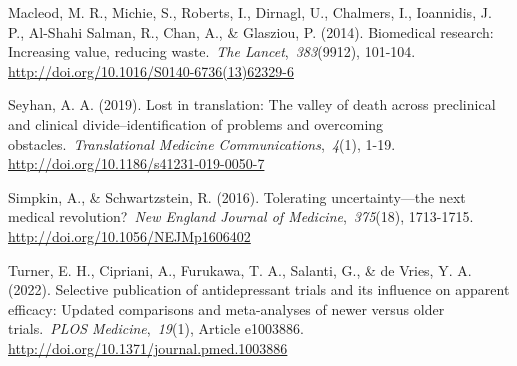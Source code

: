 \documentclass[authordate, empirical, issue]{jote-new-article}
\begin{document}
	Macleod, M. R., Michie, S., Roberts, I., Dirnagl, U., Chalmers, I., Ioannidis, J. P., Al-Shahi Salman, R., Chan, A., \& Glasziou, P. (2014). Biomedical research: Increasing value, reducing waste. \emph{The Lancet}, \emph{383}(9912), 101-104. \url{http://doi.org/10.1016/S0140-6736(13)62329-6} 
	
	Seyhan, A. A. (2019). Lost in translation: The valley of death across preclinical and clinical divide--identification of problems and overcoming obstacles. \emph{Translational Medicine Communications}, \emph{4}(1), 1-19. \url{http://doi.org/10.1186/s41231-019-0050-7}
	
	Simpkin, A., \& Schwartzstein, R. (2016). Tolerating uncertainty—the next medical revolution? \emph{New England Journal of Medicine}, \emph{375}(18), 1713-1715. \url{http://doi.org/10.1056/NEJMp1606402} 
	
	Turner, E. H., Cipriani, A., Furukawa, T. A., Salanti, G., \& de Vries, Y. A. (2022). Selective publication of antidepressant trials and its influence on apparent efficacy: Updated comparisons and meta-analyses of newer versus older trials. \emph{PLOS Medicine}, \emph{19}(1), Article e1003886. \url{http://doi.org/10.1371/journal.pmed.1003886}
\end{document}
